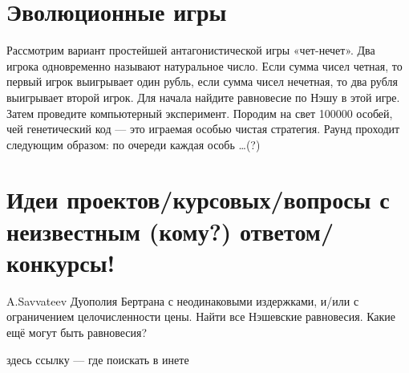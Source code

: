 \section{Эволюционные игры}

\begin{problem}[Эволюция]

Рассмотрим вариант простейшей антагонистической игры «чет-нечет». Два игрока одновременно называют натуральное число. Если сумма чисел четная, то первый игрок выигрывает один рубль, если сумма чисел нечетная, то два рубля выигрывает второй игрок. Для начала найдите равновесие по Нэшу в этой игре. Затем проведите компьютерный эксперимент. Породим на свет 100000 особей, чей генетический код — это играемая особью чистая стратегия. Раунд проходит следующим образом: по очереди каждая особь \ldots (?)



\begin{sol}

\end{sol}
\end{problem}














\section{Идеи проектов/курсовых/вопросы с неизвестным (кому?) ответом/конкурсы!}


\begin{problem}
 A.Savvateev
Дуополия Бертрана с неодинаковыми издержками,
и/или с ограничением целочисленности цены. Найти
все Нэшевские равновесия. Какие ещё могут быть
равновесия?



\begin{sol}
здесь ссылку — где поискать в инете
\end{sol}
\end{problem}




